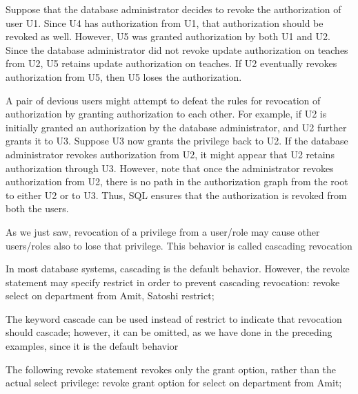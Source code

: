 \documentclass[8pt, a4paper, oneside, twocolumn]{extarticle}
\begin{document}
Suppose that the database administrator decides to revoke the authorization of
user U1. Since U4 has authorization from U1, that authorization should be revoked
as well. However, U5 was granted authorization by both U1 and U2. Since the
database administrator did not revoke update authorization on teaches from U2,
U5 retains update authorization on teaches. If U2 eventually revokes authorization
from U5, then U5 loses the authorization.

A pair of devious users might attempt to defeat the rules for revocation
of authorization by granting authorization to each other. For example, if U2 is
initially granted an authorization by the database administrator, and U2 further
grants it to U3. Suppose U3 now grants the privilege back to U2. If the database
administrator revokes authorization from U2, it might appear that U2 retains
authorization through U3. However, note that once the administrator revokes
authorization from U2, there is no path in the authorization graph from the root
to either U2 or to U3. Thus, SQL ensures that the authorization is revoked from
both the users.

As we just saw, revocation of a privilege from a user/role may cause other
users/roles also to lose that privilege. This behavior is called cascading revocation

In most database systems, cascading is the default behavior. However, the revoke
statement may specify restrict in order to prevent cascading revocation:
revoke select on department from Amit, Satoshi restrict;

The keyword cascade can be used instead of restrict to indicate that revocation
should cascade; however, it can be omitted, as we have done in the preceding
examples, since it is the default behavior

The following revoke statement revokes only the grant option, rather than
the actual select privilege:
revoke grant option for select on department from Amit;
\end{document}
